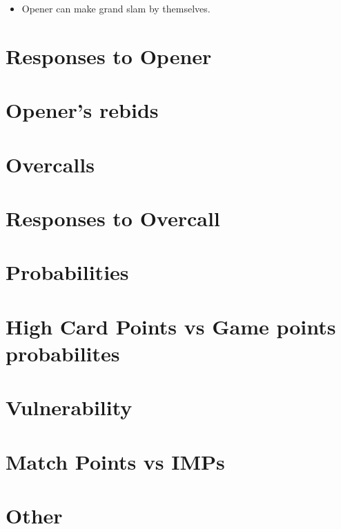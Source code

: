 \documentclass{article}
\begin{document}
\begin{itemize}
\item Opener can make grand slam by themselves.
\end{itemize}

\section{Responses to Opener}
\section{Opener's rebids}

\section{Overcalls}
\section{Responses to Overcall}

\section{Probabilities}
\section{High Card Points vs Game points probabilites}
\section{Vulnerability}
\section{Match Points vs IMPs}
\section{Other}
\end{document}
